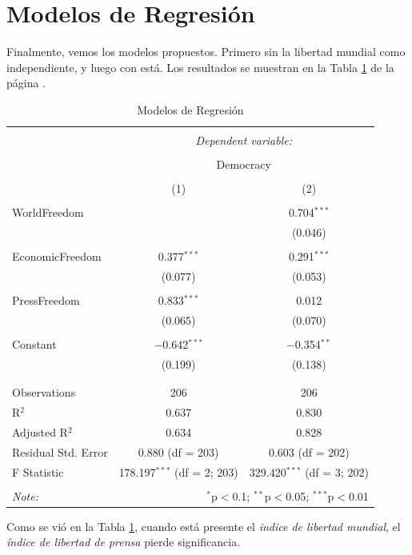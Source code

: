 \section{Modelos de Regresión}

Finalmente, vemos los modelos propuestos. Primero sin la libertad mundial como independiente, y luego con está. Los resultados se muestran en la Tabla \ref{regresiones} de la página \pageref{regresiones}.




\begin{table}[!htbp] \centering 
  \caption{Modelos de Regresión} 
  \label{regresiones} 
\begin{tabular}{@{\extracolsep{5pt}}lcc} 
\\[-1.8ex]\hline 
\hline \\[-1.8ex] 
 & \multicolumn{2}{c}{\textit{Dependent variable:}} \\ 
\cline{2-3} 
\\[-1.8ex] & \multicolumn{2}{c}{Democracy} \\ 
\\[-1.8ex] & (1) & (2)\\ 
\hline \\[-1.8ex] 
 WorldFreedom &  & 0.704$^{***}$ \\ 
  &  & (0.046) \\ 
  & & \\ 
 EconomicFreedom & 0.377$^{***}$ & 0.291$^{***}$ \\ 
  & (0.077) & (0.053) \\ 
  & & \\ 
 PressFreedom & 0.833$^{***}$ & 0.012 \\ 
  & (0.065) & (0.070) \\ 
  & & \\ 
 Constant & $-$0.642$^{***}$ & $-$0.354$^{**}$ \\ 
  & (0.199) & (0.138) \\ 
  & & \\ 
\hline \\[-1.8ex] 
Observations & 206 & 206 \\ 
R$^{2}$ & 0.637 & 0.830 \\ 
Adjusted R$^{2}$ & 0.634 & 0.828 \\ 
Residual Std. Error & 0.880 (df = 203) & 0.603 (df = 202) \\ 
F Statistic & 178.197$^{***}$ (df = 2; 203) & 329.420$^{***}$ (df = 3; 202) \\ 
\hline 
\hline \\[-1.8ex] 
\textit{Note:}  & \multicolumn{2}{r}{$^{*}$p$<$0.1; $^{**}$p$<$0.05; $^{***}$p$<$0.01} \\ 
\end{tabular} 
\end{table} 
Como se vió en la Tabla \ref{regresiones}, cuando está presente el \emph{indice de libertad mundial}, el \emph{índice de libertad de prensa} pierde significancia.


